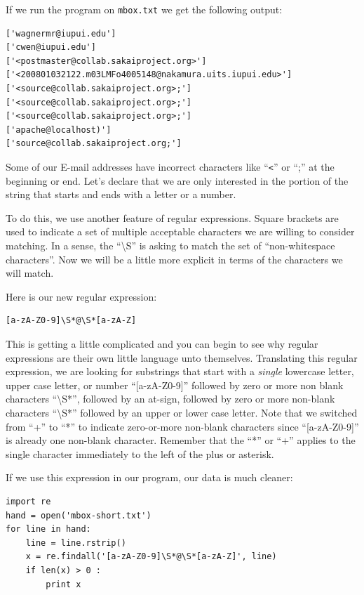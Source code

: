 \documentclass[11pt]{book}
\begin{document}
If we run the program on {\tt mbox.txt} we get the following output:

\beforeverb
\begin{verbatim}
['wagnermr@iupui.edu']
['cwen@iupui.edu']
['<postmaster@collab.sakaiproject.org>']
['<200801032122.m03LMFo4005148@nakamura.uits.iupui.edu>']
['<source@collab.sakaiproject.org>;']
['<source@collab.sakaiproject.org>;']
['<source@collab.sakaiproject.org>;']
['apache@localhost)']
['source@collab.sakaiproject.org;']
\end{verbatim}
\afterverb
%
Some of our E-mail addresses have incorrect characters like ``\verb"<"'' or ``;'' at the beginning or end.   Let's declare that we are only interested in the portion of the string that starts and ends with a letter or a number.

To do this, we use another feature of regular expressions.  Square brackets are used to indicate a set of multiple acceptable characters we are willing to consider matching.  In a sense, the ``{\textbackslash}S'' is asking to match the set of ``non-whitespace characters''.  Now we will be a little more explicit in terms of the characters we will match.

Here is our new regular expression:

\beforeverb
\begin{verbatim}
[a-zA-Z0-9]\S*@\S*[a-zA-Z]
\end{verbatim}
\afterverb
%
This is getting a little complicated and you can begin to see why regular expressions are their own little language unto themselves.  Translating this regular expression, we are looking for substrings that start with a {\em single} lowercase letter, upper case letter, or number ``[a-zA-Z0-9]'' followed by zero or more non blank characters ``{\textbackslash}S*'', followed by an at-sign, followed by zero or more non-blank characters ``{\textbackslash}S*'' followed by an upper or lower case letter.  Note that we switched from ``+'' to ``*'' to indicate zero-or-more non-blank characters since ``[a-zA-Z0-9]'' is already one non-blank character.   Remember that the ``*'' or ``+'' applies to the single character immediately to the left of the plus or asterisk.

If we use this expression in our program, our data is much cleaner:

\beforeverb
\begin{verbatim}
import re
hand = open('mbox-short.txt')
for line in hand:
    line = line.rstrip()
    x = re.findall('[a-zA-Z0-9]\S*@\S*[a-zA-Z]', line)
    if len(x) > 0 :
        print x
\end{verbatim}
\afterverb
%
\end{document}
